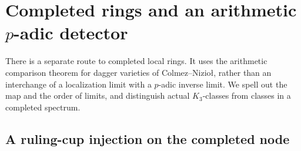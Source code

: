 \documentclass[11pt,a4paper]{article}
\theoremstyle{remark}
\begin{document}
\section{Completed rings and an arithmetic \texorpdfstring{$p$}{p}-adic detector}\label{sec:completed}

There is a separate route to completed local rings. It uses the arithmetic comparison theorem for dagger varieties of Colmez--Nizio\l, rather than an interchange of a localization limit with a $p$-adic inverse limit. We spell out the map and the order of limits, and distinguish actual $K_3$-classes from classes in a completed spectrum.

\subsection{A ruling-cup injection on the completed node}
\end{document}
